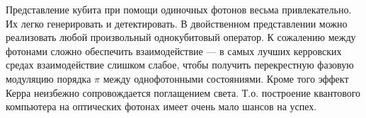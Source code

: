 Представление кубита при помощи одиночных фотонов весьма привлекательно. Их
легко генерировать и детектировать. В двойственном представлении можно
реализовать любой произвольный однокубитовый оператор. К сожалению между
фотонами сложно обеспечить взаимодействие --- в самых лучших керровских средах
взаимодействие слишком слабое, чтобы получить перекрестную фазовую модуляцию
порядка $\pi$ между однофотонными состояниями. Кроме того эффект Керра
неизбежно сопровождается поглащением света. Т.о. построение квантового
компьютера на оптических фотонах имеет очень мало шансов на успех.
